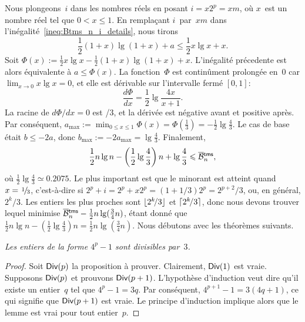 Nous plongeons~\(i\) dans les nombres réels en posant \(i=x2^p=xm\),
où \(x\)~est un nombre réel tel que \(0 < x \leqslant 1\). En
remplaçant \(i\)~par~\(xm\) dans
l'inégalité~\eqref{ineq:Btms_n_i_details}, nous tirons
\begin{equation*}
\frac{1}{2}(1+x)\lg(1+x) + a \leqslant \frac{1}{2}x\lg x + x.
\end{equation*}
Soit \(\Phi(x) := \tfrac{1}{2}x\lg x - \tfrac{1}{2}(1+x)\lg(1+x) +
x\). L'inégalité précedente est alors équivalente à \(a \leqslant
\Phi(x)\). La fonction~\(\Phi\) est continûment prolongée en~\(0\) car
\(\lim_{x \to 0} x\lg x = 0\), et elle est dérivable sur l'intervalle
fermé \([0,1]\):
\begin{equation}
\frac{d\Phi}{dx} = \frac{1}{2}\lg\frac{4x}{x+1}.
\label{eq:der_Phi}
\end{equation}
La racine de \(d\Phi/dx = 0\) est /{3}, et la dérivée est
négative avant et positive après. Par conséquent, \(a_{\max} :=
\min_{0 \leqslant x \leqslant 1}\Phi(x) = \Phi(\tfrac{1}{3}) =
-\tfrac{1}{2}\lg\tfrac{4}{3}\). Le cas de base était \(b \leqslant
-2a\), donc \(b_{\max} := -2a_{\max} = \lg\tfrac{4}{3}\). Finalement,
\begin{equation}
  \frac{1}{2}n\lg n - \left(\frac{1}{2}\lg\frac{4}{3}\right)n + \lg\frac{4}{3}
  \leqslant \OB{\fun{tms}}{n},
\label{ineq:lower_Btms}
\end{equation}
où \(\tfrac{1}{2}\lg\tfrac{4}{3} \simeq 0.2075\). Le plus important
est que le minorant est atteint quand \(x=\myfrac{1}/{3}\),
c'est-à-dire si \(2^p+i=2^p+x2^p=(1+1/3)2^p=2^{p+2}\!/3\), ou, en
général, \(2^k\!/3\). Les entiers les plus proches sont
\(\lfloor{2^k\!/3}\rfloor\) et \(\lceil{2^k\!/3}\rceil\), donc nous devons trouver
lequel minimise \(\OB{\fun{tms}}{n} -
\tfrac{1}{2}n\lg(\tfrac{3}{4}n)\), étant donné que \(\tfrac{1}{2}n\lg
n - \left(\tfrac{1}{2}\lg\tfrac{4}{3}\right)n =
\tfrac{1}{2}n\lg(\tfrac{3}{4}n)\). Nous débutons avec les théorèmes
suivants.
\begin{lemma}
\label{lem_div3}
\textsl{Les entiers de la forme \(4^p-1\) sont divisibles par~\(3\).}
\end{lemma}
\begin{proof}
  Soit \(\textsf{Div}({p})\) la proposition à
  prouver. Clairement, \(\textsf{Div}({1})\) est vraie. Supposons
  \(\textsf{Div}({p})\) et prouvons \(\textsf{Div}({p+1})\). L'hypothèse
  d'induction veut dire qu'il existe un entier~\(q\) tel que \(4^p - 1
  = 3q\). Par conséquent, \(4^{p+1} - 1 = 3(4q+1)\), ce qui signifie
  que \(\textsf{Div}({p+1})\) est vraie. Le principe d'induction implique
  alors que le lemme est vrai pour tout entier~\(p\).
\end{proof}
